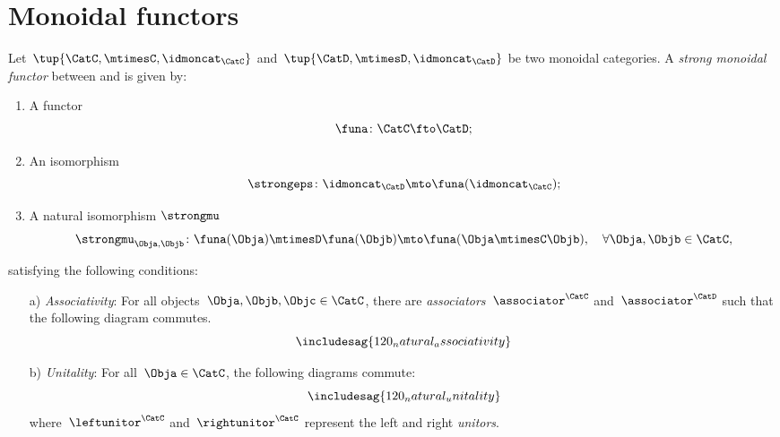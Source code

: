 

\section{Monoidal functors}
\label{sec:monoidal-functors}
\begin{ctdefinition}
    \label{def:strong-monoidal-functor}

    Let~$\tup{\CatC,\mtimesC,\idmoncat_{\CatC}}$ and~$\tup{\CatD,\mtimesD,\idmoncat_{\CatD}}$ be two monoidal categories.
    A \emph{strong monoidal functor} between \CatC and \CatD is given by:
    \begin{enumerate}
        \item A functor
        \begin{equation}
            \funa \colon \CatC \fto \CatD;
        \end{equation}
        \item An isomorphism
        \begin{equation}
            \strongeps\colon \idmoncat_{\CatD}\mto \funa(\idmoncat_{\CatC});
        \end{equation}
        \item A natural isomorphism $\strongmu$
        \begin{equation}
            \strongmu_{\Obja,\Objb}\colon \funa(\Obja)\mtimesD \funa(\Objb) \mto \funa(\Obja \mtimesC \Objb),\quad \forall \Obja,\Objb\in \CatC,
        \end{equation}
    \end{enumerate}
    satisfying the following conditions:
    \begin{enumerate}
        \item[a)] \emph{Associativity}: For all objects~$\Obja,\Objb,\Objc\in \CatC$,
        there are  \emph{associators}~$\associator^\CatC$ and~$\associator^\CatD$ such that
        the following diagram commutes.
        \begin{equation}
            \label{eq:120_natural_associativity}
            \includesag{120_natural_associativity}
        \end{equation}

        \item[b)] \emph{Unitality}: For all~$\Obja\in \CatC$, the following diagrams commute:
        \begin{equation}
            \label{eq:120_natural_unitality}
            \includesag{120_natural_unitality}
        \end{equation}
        where~$\leftunitor^\CatC$ and~$\rightunitor^\CatC$ represent the left and right \emph{unitors}.
    \end{enumerate}
\end{ctdefinition}

